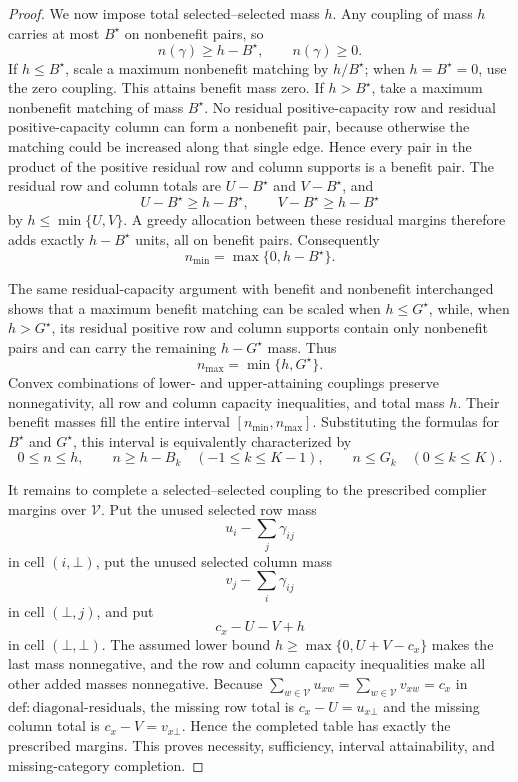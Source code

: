 \documentclass{article}
\begin{document}
\begin{proof}
We now impose total selected--selected mass \(h\).  Any coupling of mass \(h\) carries at most \(B^\star\) on nonbenefit pairs, so
\[
 n(\gamma)\geq h-B^\star,
 \qquad
 n(\gamma)\geq0.
\]
If \(h\leq B^\star\), scale a maximum nonbenefit matching by \(h/B^\star\); when \(h=B^\star=0\), use the zero coupling.  This attains benefit mass zero.  If \(h>B^\star\), take a maximum nonbenefit matching of mass \(B^\star\).  No residual positive-capacity row and residual positive-capacity column can form a nonbenefit pair, because otherwise the matching could be increased along that single edge.  Hence every pair in the product of the positive residual row and column supports is a benefit pair.  The residual row and column totals are \(U-B^\star\) and \(V-B^\star\), and
\[
 U-B^\star\geq h-B^\star,
 \qquad
 V-B^\star\geq h-B^\star
\]
by \(h\leq\min\{U,V\}\).  A greedy allocation between these residual margins therefore adds exactly \(h-B^\star\) units, all on benefit pairs.  Consequently
\[
 n_{\min}=\max\{0,h-B^\star\}.
\]

The same residual-capacity argument with benefit and nonbenefit interchanged shows that a maximum benefit matching can be scaled when \(h\leq G^\star\), while, when \(h>G^\star\), its residual positive row and column supports contain only nonbenefit pairs and can carry the remaining \(h-G^\star\) mass.  Thus
\[
 n_{\max}=\min\{h,G^\star\}.
\]
Convex combinations of lower- and upper-attaining couplings preserve nonnegativity, all row and column capacity inequalities, and total mass \(h\).  Their benefit masses fill the entire interval \([n_{\min},n_{\max}]\).  Substituting the formulas for \(B^\star\) and \(G^\star\), this interval is equivalently characterized by
\[
 0\leq n\leq h,
 \qquad
 n\geq h-B_k\quad(-1\leq k\leq K-1),
 \qquad
 n\leq G_k\quad(0\leq k\leq K).
\]

It remains to complete a selected--selected coupling to the prescribed complier margins over \(\mathcal V\).  Put the unused selected row mass
\[
 u_i-\sum_j\gamma_{ij}
\]
in cell \((i,\bot)\), put the unused selected column mass
\[
 v_j-\sum_i\gamma_{ij}
\]
in cell \((\bot,j)\), and put
\[
 c_x-U-V+h
\]
in cell \((\bot,\bot)\).  The assumed lower bound \(h\geq\max\{0,U+V-c_x\}\) makes the last mass nonnegative, and the row and column capacity inequalities make all other added masses nonnegative.  Because \(\sum_{w\in\mathcal V}u_{xw}=\sum_{w\in\mathcal V}v_{xw}=c_x\) in \(\mathrm{def:diagonal\text{-}residuals}\), the missing row total is \(c_x-U=u_{x\bot}\) and the missing column total is \(c_x-V=v_{x\bot}\).  Hence the completed table has exactly the prescribed margins.  This proves necessity, sufficiency, interval attainability, and missing-category completion.
\end{proof}
\end{document}
